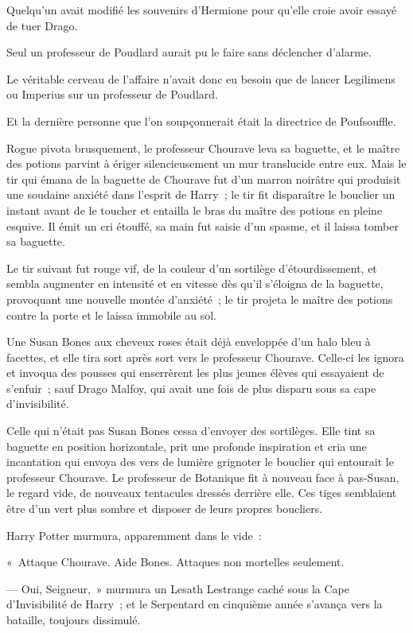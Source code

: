 Quelqu'un avait modifié les souvenirs d'Hermione pour qu'elle croie avoir essayé de tuer Drago.

Seul un professeur de Poudlard aurait pu le faire sans déclencher d'alarme.

Le véritable cerveau de l'affaire n'avait donc eu besoin que de lancer Legilimens ou Imperius sur un professeur de Poudlard.

Et la dernière personne que l'on soupçonnerait était la directrice de Poufsouffle.

Rogue pivota brusquement, le professeur Chourave leva sa baguette, et le maître des potions parvint à ériger silencieusement un mur translucide entre eux. Mais le tir qui émana de la baguette de Chourave fut d'un marron noirâtre qui produisit une soudaine anxiété dans l'esprit de Harry~; le tir fit disparaître le bouclier un instant avant de le toucher et entailla le bras du maître des potions en pleine esquive. Il émit un cri étouffé, sa main fut saisie d'un spasme, et il laissa tomber sa baguette.

Le tir suivant fut rouge vif, de la couleur d'un sortilège d'étourdissement, et sembla augmenter en intensité et en vitesse dès qu'il s'éloigna de la baguette, provoquant une nouvelle montée d'anxiété~; le tir projeta le maître des potions contre la porte et le laissa immobile au sol.

Une Susan Bones aux cheveux roses était déjà enveloppée d'un halo bleu à facettes, et elle tira sort après sort vers le professeur Chourave. Celle-ci les ignora et invoqua des pousses qui enserrèrent les plus jeunes élèves qui essayaient de s'enfuir~; sauf Drago Malfoy, qui avait une fois de plus disparu sous sa cape d'invisibilité.

Celle qui n'était pas Susan Bones cessa d'envoyer des sortilèges. Elle tint sa baguette en position horizontale, prit une profonde inspiration et cria une incantation qui envoya des vers de lumière grignoter le bouclier qui entourait le professeur Chourave. Le professeur de Botanique fit à nouveau face à pas-Susan, le regard vide, de nouveaux tentacules dressés derrière elle. Ces tiges semblaient être d'un vert plus sombre et disposer de leurs propres boucliers.

Harry Potter murmura, apparemment dans le vide~:

«~Attaque Chourave. Aide Bones. Attaques non mortelles seulement.

--- Oui, Seigneur,~» murmura un Lesath Lestrange caché sous la Cape d'Invisibilité de Harry~; et le Serpentard en cinquième année s'avança vers la bataille, toujours dissimulé.

